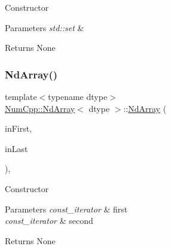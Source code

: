 Constructor


\begin{DoxyParams}{Parameters}
{\em std\+::set} & \\
\hline
\end{DoxyParams}
\begin{DoxyReturn}{Returns}
None 
\end{DoxyReturn}
\mbox{\label{class_num_cpp_1_1_nd_array_a1e3ccf914358a4f85f06f8307265ece0}} 
\subsubsection{\texorpdfstring{Nd\+Array()}{NdArray()}\hspace{0.1cm}{\footnotesize\ttfamily [9/12]}}
{\footnotesize\ttfamily template$<$typename dtype$>$ \\
\mbox{\hyperlink{class_num_cpp_1_1_nd_array}{Num\+Cpp\+::\+Nd\+Array}}$<$ dtype $>$\+::\mbox{\hyperlink{class_num_cpp_1_1_nd_array}{Nd\+Array}} (\begin{DoxyParamCaption}\item[{\mbox{\hyperlink{class_num_cpp_1_1_nd_array_a770eaf3b67efaa19e310ed14eee5aabb}{const\+\_\+iterator}}}]{in\+First,  }\item[{\mbox{\hyperlink{class_num_cpp_1_1_nd_array_a770eaf3b67efaa19e310ed14eee5aabb}{const\+\_\+iterator}}}]{in\+Last }\end{DoxyParamCaption})\hspace{0.3cm}{\ttfamily [inline]}, {\ttfamily [explicit]}}

Constructor


\begin{DoxyParams}{Parameters}
{\em const\+\_\+iterator} & first \\
\hline
{\em const\+\_\+iterator} & second \\
\hline
\end{DoxyParams}
\begin{DoxyReturn}{Returns}
None 
\end{DoxyReturn}
\mbox{\label{class_num_cpp_1_1_nd_array_a57fdb3909ce62c7924ffe355a30bf420}} 
